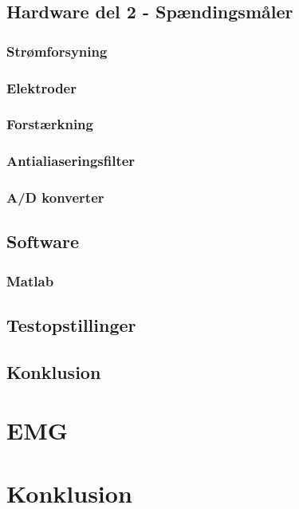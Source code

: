 \documentclass[main.tex]{subfiles}
\begin{document}
\section{Hardware del 2 - Spændingsmåler}
\subsection{Strømforsyning}
\subsection{Elektroder}
\subsection{Forstærkning}
\subsection{Antialiaseringsfilter}
\subsection{A/D konverter}


\section{Software}
\subsection{Matlab}

\section{Testopstillinger}
\section{Konklusion}

\chapter{EMG}

\chapter{Konklusion}


\end{document}
